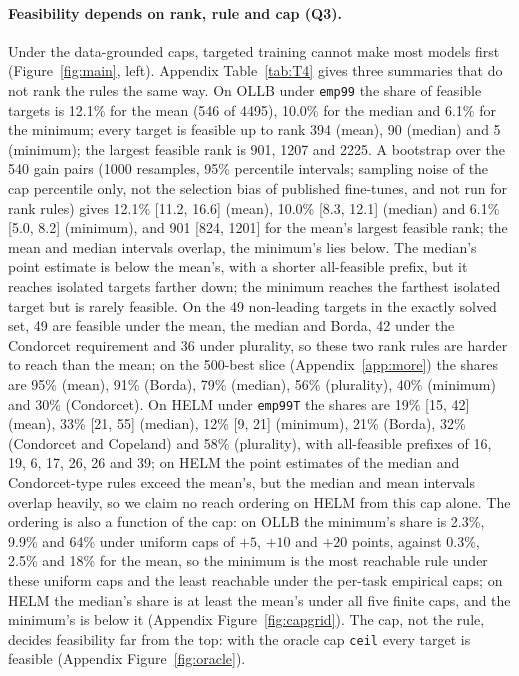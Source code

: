 \documentclass{article}
\begin{document}
\paragraph{Feasibility depends on rank, rule and cap (Q3).}
Under the data-grounded caps, targeted training cannot make most models first (Figure~\ref{fig:main}, left). Appendix Table~\ref{tab:T4} gives three summaries that do not rank the rules the same way. On OLLB under \texttt{emp99} the share of feasible targets is 12.1\% for the mean (546 of 4495), 10.0\% for the median and 6.1\% for the minimum; every target is feasible up to rank 394 (mean), 90 (median) and 5 (minimum); the largest feasible rank is 901, 1207 and 2225. A bootstrap over the 540 gain pairs (1000 resamples, 95\% percentile intervals; sampling noise of the cap percentile only, not the selection bias of published fine-tunes, and not run for rank rules) gives 12.1\% [11.2, 16.6] (mean), 10.0\% [8.3, 12.1] (median) and 6.1\% [5.0, 8.2] (minimum), and 901 [824, 1201] for the mean's largest feasible rank; the mean and median intervals overlap, the minimum's lies below. The median's point estimate is below the mean's, with a shorter all-feasible prefix, but it reaches isolated targets farther down; the minimum reaches the farthest isolated target but is rarely feasible. On the 49 non-leading targets in the exactly solved set, 49 are feasible under the mean, the median and Borda, 42 under the Condorcet requirement and 36 under plurality, so these two rank rules are harder to reach than the mean; on the 500-best slice (Appendix~\ref{app:more}) the shares are 95\% (mean), 91\% (Borda), 79\% (median), 56\% (plurality), 40\% (minimum) and 30\% (Condorcet). On HELM under \texttt{emp99T} the shares are 19\% [15, 42] (mean), 33\% [21, 55] (median), 12\% [9, 21] (minimum), 21\% (Borda), 32\% (Condorcet and Copeland) and 58\% (plurality), with all-feasible prefixes of 16, 19, 6, 17, 26, 26 and 39; on HELM the point estimates of the median and Condorcet-type rules exceed the mean's, but the median and mean intervals overlap heavily, so we claim no reach ordering on HELM from this cap alone. The ordering is also a function of the cap: on OLLB the minimum's share is 2.3\%, 9.9\% and 64\% under uniform caps of $+5$, $+10$ and $+20$ points, against 0.3\%, 2.5\% and 18\% for the mean, so the minimum is the most reachable rule under these uniform caps and the least reachable under the per-task empirical caps; on HELM the median's share is at least the mean's under all five finite caps, and the minimum's is below it (Appendix Figure~\ref{fig:capgrid}). The cap, not the rule, decides feasibility far from the top: with the oracle cap \texttt{ceil} every target is feasible (Appendix Figure~\ref{fig:oracle}).
\end{document}
